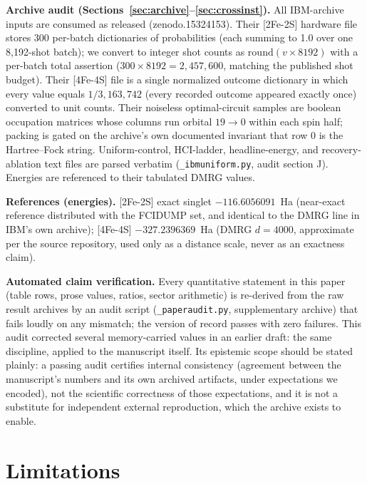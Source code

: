 \documentclass[11pt]{article}
\begin{document}
\textbf{Archive audit (Sections~\ref{sec:archive}--\ref{sec:crossinst}).} All IBM-archive inputs are consumed as released (zenodo.15324153). Their [2Fe-2S] hardware file stores 300 per-batch dictionaries of probabilities (each summing to 1.0 over one 8{,}192-shot batch); we convert to integer shot counts as $\mathrm{round}(v\times8192)$ with a per-batch total assertion ($300\times8192 = 2{,}457{,}600$, matching the published shot budget). Their [4Fe-4S] file is a single normalized outcome dictionary in which every value equals $1/3{,}163{,}742$ (every recorded outcome appeared exactly once) converted to unit counts. Their noiseless optimal-circuit samples are boolean occupation matrices whose columns run orbital $19\to0$ within each spin half; packing is gated on the archive's own documented invariant that row 0 is the Hartree--Fock string. Uniform-control, HCI-ladder, headline-energy, and recovery-ablation text files are parsed verbatim (\texttt{\_ibmuniform.py}, audit section J). Energies are referenced to their tabulated DMRG values.

\textbf{References (energies).} [2Fe-2S] exact singlet $-116.6056091$~Ha (near-exact reference distributed with the FCIDUMP set, and identical to the DMRG line in IBM's own archive); [4Fe-4S] $-327.2396369$~Ha (DMRG $d=4000$, approximate per the source repository, used only as a distance scale, never as an exactness claim).

\textbf{Automated claim verification.} Every quantitative statement in this paper (table rows, prose values, ratios, sector arithmetic) is re-derived from the raw result archives by an audit script (\texttt{\_paperaudit.py}, supplementary archive) that fails loudly on any mismatch; the version of record passes with zero failures. This audit corrected several memory-carried values in an earlier draft: the same discipline, applied to the manuscript itself. Its epistemic scope should be stated plainly: a passing audit certifies internal consistency (agreement between the manuscript's numbers and its own archived artifacts, under expectations we encoded), not the scientific correctness of those expectations, and it is not a substitute for independent external reproduction, which the archive exists to enable.

\section{Limitations}
\end{document}
